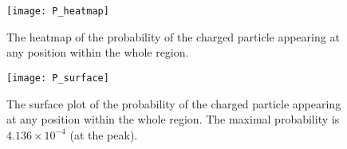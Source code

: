 \begin{figure}[!hbt]
    \centering
    \texttt{[image: P\_heatmap]}
    \caption{The heatmap of the probability of the charged particle appearing at any
        position within the whole region.}
    \label{fig:P_heatmap}
\end{figure}

\begin{figure}[!hbt]
    \centering
    \texttt{[image: P\_surface]}
    \caption{The surface plot of the probability of the charged particle appearing at any
        position within the whole region. The maximal probability is \(4.136 \times 10^{-4}\)
        (at the peak).}
    \label{fig:P_surface}
\end{figure}
